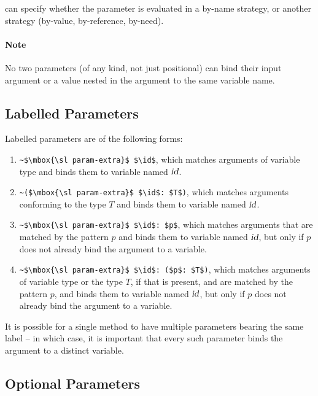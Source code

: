  can specify whether the parameter is evaluated in a by-name strategy, or another strategy (by-value, by-reference, by-need). 

\paragraph{Note}
No two parameters (of any kind, not just positional) can bind their input argument or a value nested in the argument to the same variable name. 





\subsection{Labelled Parameters}
\label{sec:labelled-parameters}

Labelled parameters are of the following forms:
\begin{enumerate}
  \item \lstinline!~$\mbox{\sl param-extra}$ $\id$!, which matches arguments of variable type and binds them to variable named $\mbox{\sl id}$. 
  \item \lstinline!~($\mbox{\sl param-extra}$ $\id$: $T$)!, which matches arguments conforming to the type $T$ and binds them to variable named $\mbox{\sl id}$. 
  \item \lstinline!~$\mbox{\sl param-extra}$ $\id$: $p$!, which matches arguments that are matched by the pattern $p$ and binds them to variable named $\mbox{\sl id}$, but only if $p$ does not already bind the argument to a variable. 
  \item \lstinline!~$\mbox{\sl param-extra}$ $\id$: ($p$: $T$)!, which matches arguments of variable type or the type $T$, if that is present, and are matched by the pattern $p$, and binds them to variable named $\mbox{\sl id}$, but only if $p$ does not already bind the argument to a variable. 
\end{enumerate}

It is possible for a single method to have multiple parameters bearing the same label -- in which case, it is important that every such parameter binds the argument to a distinct variable. 





\subsection{Optional Parameters}
\label{sec:optional-parameters}

